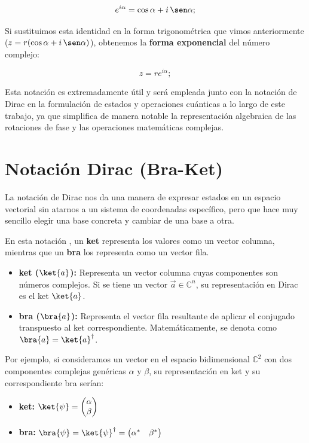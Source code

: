 \[
    e^{i\alpha} = \cos \alpha + i \, \sen \alpha;
\]

Si sustituimos esta identidad en la forma trigonométrica que vimos anteriormente ($z = r (\cos \alpha + i \, \sen \alpha)$), obtenemos la \textbf{forma exponencial} del número complejo:

\[
    z = r e^{i\alpha};
\]

Esta notación es extremadamente útil y será empleada junto con la notación de Dirac en la formulación de estados y operaciones cuánticas a lo largo de este trabajo, ya que simplifica de manera notable la representación algebraica de las rotaciones de fase y las operaciones matemáticas complejas.

\section{Notación Dirac (Bra-Ket)}
\label{sec:notacion_dirac}

La notación de Dirac nos da una manera de expresar estados en un espacio vectorial sin atarnos a un sistema de coordenadas específico, pero que hace muy sencillo elegir una base concreta y cambiar de una base a otra.

En esta notación \cite{pierce_braket_2025}, un \textbf{ket} representa los valores como un vector columna, mientras que un \textbf{bra} los representa como un vector fila.

\begin{itemize}
    \item \textbf{ket ($\ket{a}$):} Representa un vector columna cuyas componentes son números complejos. Si se tiene un vector $\vec{a} \in \mathbb{C}^n$, su representación en Dirac es el ket $\ket{a}$.
    \item \textbf{bra ($\bra{a}$):} Representa el vector fila resultante de aplicar el conjugado transpuesto al ket correspondiente. Matemáticamente, se denota como $\bra{a} = \ket{a}^{\dagger}$.
\end{itemize}

Por ejemplo, si consideramos un vector en el espacio bidimensional $\mathbb{C}^2$ con dos componentes complejas genéricas $\alpha$ y $\beta$, su representación en ket y su correspondiente bra serían:

\begin{itemize}
    \item \textbf{ket:} $\ket{\psi} = \begin{pmatrix} \alpha \\ \beta \end{pmatrix}$
    \item \textbf{bra:} $\bra{\psi} = \ket{\psi}^{\dagger} = \begin{pmatrix} \alpha^* & \beta^* \end{pmatrix}$
\end{itemize}

